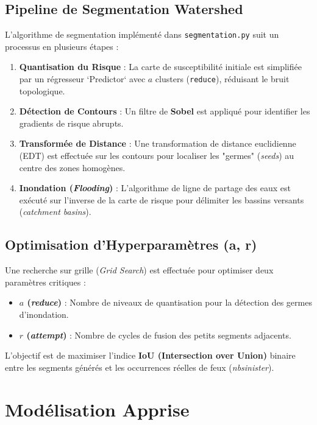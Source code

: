 \documentclass[11pt,a4paper]{article}
\begin{document}
\subsection{Pipeline de Segmentation Watershed}
L'algorithme de segmentation implémenté dans \texttt{segmentation.py} suit un processus en plusieurs étapes :
\begin{enumerate}
    \item \textbf{Quantisation du Risque} : La carte de susceptibilité initiale est simplifiée par un régresseur `Predictor` avec $a$ clusters (\texttt{reduce}), réduisant le bruit topologique.
    \item \textbf{Détection de Contours} : Un filtre de \textbf{Sobel} est appliqué pour identifier les gradients de risque abrupts.
    \item \textbf{Transformée de Distance} : Une transformation de distance euclidienne (EDT) est effectuée sur les contours pour localiser les "germes" (\textit{seeds}) au centre des zones homogènes.
    \item \textbf{Inondation (\textit{Flooding})} : L'algorithme de ligne de partage des eaux est exécuté sur l'inverse de la carte de risque pour délimiter les bassins versants (\textit{catchment basins}).
\end{enumerate}

\subsection{Optimisation d'Hyperparamètres (a, r)}
Une recherche sur grille (\textit{Grid Search}) est effectuée pour optimiser deux paramètres critiques :
\begin{itemize}
    \item \textbf{$a$ (\textit{reduce})} : Nombre de niveaux de quantisation pour la détection des germes d'inondation.
    \item \textbf{$r$ (\textit{attempt})} : Nombre de cycles de fusion des petits segments adjacents.
\end{itemize}
L'objectif est de maximiser l'indice \textbf{IoU (Intersection over Union)} binaire entre les segments générés et les occurrences réelles de feux (\textit{nbsinister}).

\section{Modélisation Apprise}
\end{document}
